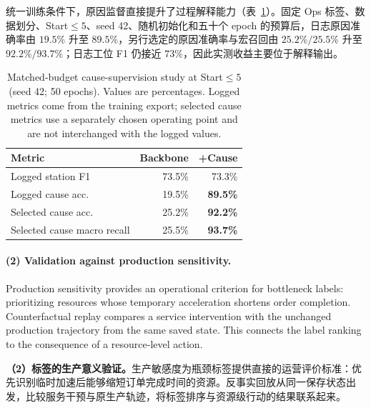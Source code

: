 \documentclass[a4paper,fleqn]{cas-dc}
\newcommand{\zhpara}[1]{%
  \par\begingroup\small\color{black!72}\noindent #1\par\endgroup}
\begin{document}
\zhpara{统一训练条件下，原因监督直接提升了过程解释能力（表~\ref{tab:matched-cause}）。固定 Ops 标签、数据划分、Start$\leq5$、seed 42、随机初始化和五十个 epoch 的预算后，日志原因准确率由 $19.5\%$ 升至 $89.5\%$，另行选定的原因准确率与宏召回由 $25.2\%/25.5\%$ 升至 $92.2\%/93.7\%$；日志工位 F1 仍接近 $73\%$，因此实测收益主要位于解释输出。}

\begin{table}[t]
\centering
\caption{Matched-budget cause-supervision study at Start$\leq5$ (seed 42; 50 epochs). Values are percentages. Logged metrics come from the training export; selected cause metrics use a separately chosen operating point and are not interchanged with the logged values.}
\label{tab:matched-cause}
\scriptsize
\setlength{\tabcolsep}{3.5pt}
\renewcommand{\arraystretch}{1.08}
\begin{tabular*}{\columnwidth}{@{\extracolsep{\fill}}lrr@{}}
\toprule
Metric & Backbone & +Cause \\
\midrule
Logged station F1 & 73.5\% & 73.3\% \\
Logged cause acc. & 19.5\% & \textbf{89.5\%} \\
Selected cause acc. & 25.2\% & \textbf{92.2\%} \\
Selected cause macro recall & 25.5\% & \textbf{93.7\%} \\
\bottomrule
\end{tabular*}
\end{table}

\paragraph*{(2) Validation against production sensitivity.}
Production sensitivity provides an operational criterion for bottleneck labels: prioritizing resources whose temporary acceleration shortens order completion. Counterfactual replay compares a service intervention with the unchanged production trajectory from the same saved state. This connects the label ranking to the consequence of a resource-level action.

\zhpara{\textbf{（2）标签的生产意义验证。}生产敏感度为瓶颈标签提供直接的运营评价标准：优先识别临时加速后能够缩短订单完成时间的资源。反事实回放从同一保存状态出发，比较服务干预与原生产轨迹，将标签排序与资源级行动的结果联系起来。}
\end{document}

